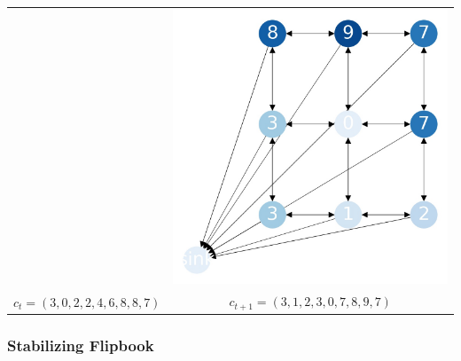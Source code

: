 \documentclass{beamer}
\begin{document}
\begin{frame}
\begin{tabular}{cc}
  &   \includegraphics[scale=0.15]{sandpile_13}\\



$c_t = (3,0,2,2,4,6,8,8,7)$  & $c_{t+1} = (3,1,2,3,0,7,8,9,7)$

\end{tabular}



\end{frame}



\begin{frame}
\frametitle{Stabilizing Flipbook}

\end{frame}
\end{document}
